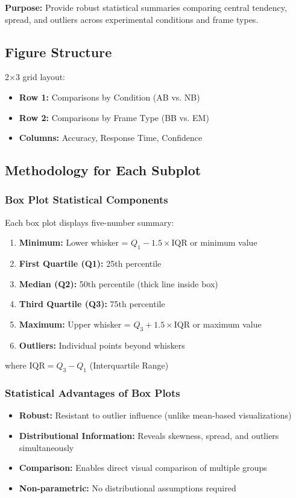 \documentclass[12pt,a4paper]{article}
\begin{document}
\textbf{Purpose:} Provide robust statistical summaries comparing central tendency, spread, and outliers across experimental conditions and frame types.

\subsection{Figure Structure}

2×3 grid layout:
\begin{itemize}
    \item \textbf{Row 1:} Comparisons by Condition (AB vs. NB)
    \item \textbf{Row 2:} Comparisons by Frame Type (BB vs. EM)
    \item \textbf{Columns:} Accuracy, Response Time, Confidence
\end{itemize}

\subsection{Methodology for Each Subplot}

\subsubsection{Box Plot Statistical Components}

Each box plot displays five-number summary:
\begin{enumerate}
    \item \textbf{Minimum:} Lower whisker = $Q_1 - 1.5 \times \text{IQR}$ or minimum value
    \item \textbf{First Quartile (Q1):} 25th percentile
    \item \textbf{Median (Q2):} 50th percentile (thick line inside box)
    \item \textbf{Third Quartile (Q3):} 75th percentile
    \item \textbf{Maximum:} Upper whisker = $Q_3 + 1.5 \times \text{IQR}$ or maximum value
    \item \textbf{Outliers:} Individual points beyond whiskers
\end{enumerate}

where $\text{IQR} = Q_3 - Q_1$ (Interquartile Range)

\subsubsection{Statistical Advantages of Box Plots}
\begin{itemize}
    \item \textbf{Robust:} Resistant to outlier influence (unlike mean-based visualizations)
    \item \textbf{Distributional Information:} Reveals skewness, spread, and outliers simultaneously
    \item \textbf{Comparison:} Enables direct visual comparison of multiple groups
    \item \textbf{Non-parametric:} No distributional assumptions required
\end{itemize}
\end{document}
